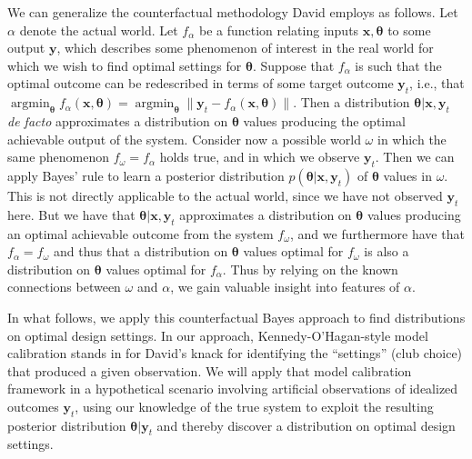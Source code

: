 \documentclass[12pt]{article}
\DeclareMathOperator*{\argmin}{argmin}
\begin{document}
%
We can generalize the counterfactual methodology David employs as follows.
%
Let $\alpha$ denote the actual world. 
%
Let $f_\alpha$ be a function relating inputs $\mathbf x,\boldsymbol \theta$ to some output $\mathbf y$, which describes some phenomenon of interest in the real world for which we wish to find optimal settings for $\boldsymbol\theta$. 
%
Suppose that $f_\alpha$ is such that the optimal outcome can be redescribed in terms of some target outcome $\mathbf y_t$, i.e., that $\argmin_{\boldsymbol\theta} f_\alpha(\mathbf x,\boldsymbol \theta)=\argmin_{\boldsymbol\theta} \lVert \mathbf y_{t} - f_\alpha(\mathbf x,\boldsymbol\theta)\rVert$. 
%
Then a distribution $\boldsymbol\theta|\mathbf x,\mathbf y_{t}$ \textit{de facto} approximates a distribution on $\boldsymbol\theta$ values producing the optimal achievable output of the system. 
%
%
Consider now a possible world $\omega$ in which the same phenomenon $f_\omega=f_\alpha$ holds true, and in which we observe $\mathbf y_{t}$. 
%
Then we can apply Bayes' rule to learn a posterior distribution $p(\boldsymbol\theta|\mathbf x,\mathbf y_{t})$ of $\boldsymbol \theta$ values in $\omega$. 
%
This is not directly applicable to the actual world, since we have not observed $\mathbf y_{t}$ here. 
%
But we have that $\boldsymbol\theta|\mathbf x,\mathbf y_{t}$ approximates a distribution on $\boldsymbol \theta$ values producing an optimal achievable outcome from the system $f_\omega$, and we furthermore have that $f_\alpha=f_\omega$ and thus that a distribution on $\boldsymbol \theta$ values optimal for $f_\omega$ is also a distribution on $\boldsymbol \theta$ values optimal for $f_\alpha$. 
%
Thus by relying on the known connections between $\omega$ and $\alpha$, we gain valuable insight into features of $\alpha$.
%

%
In what follows, we apply this counterfactual Bayes approach to find distributions on optimal design settings.
%
In our approach, Kennedy-O'Hagan-style model calibration \citep{Kennedy2001} stands in for David's knack for identifying the ``settings'' (club choice) that produced a given observation.
%
We will apply that model calibration framework in a hypothetical scenario involving artificial observations of idealized outcomes $\mathbf y_t$, using our knowledge of the true system to exploit the resulting posterior distribution $\boldsymbol\theta|\mathbf y_t$ and thereby discover a distribution on optimal design settings.
%
\end{document}
